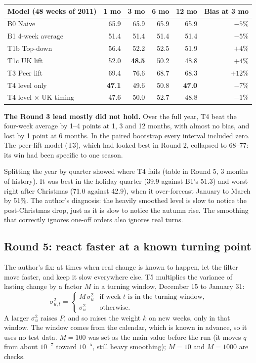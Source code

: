 \documentclass[11pt]{article}
\newcommand{\best}[1]{\textbf{#1}}
\begin{document}
\begin{center}
\begin{tabular}{l r r r r r}
\toprule
Model (48 weeks of 2011) & 1 mo & 3 mo & 6 mo & 12 mo & Bias at 3 mo \\
\midrule
B0 Naive & 65.9 & 65.9 & 65.9 & 65.9 & $-5\%$ \\
B1 4-week average & 51.4 & 51.4 & 51.4 & 51.4 & $-5\%$ \\
T1b Top-down & 56.4 & 52.2 & 52.5 & 51.9 & $+4\%$ \\
T1c UK lift & 52.0 & \best{48.5} & 50.2 & 48.8 & $+4\%$ \\
T3 Peer lift & 69.4 & 76.6 & 68.7 & 68.3 & $+12\%$ \\
T4 level only & \best{47.1} & 49.6 & 50.8 & \best{47.0} & $-7\%$ \\
T4 level $\times$ UK timing & 47.6 & 50.0 & 52.7 & 48.8 & $-1\%$ \\
\bottomrule
\end{tabular}
\end{center}

\textbf{The Round 3 lead mostly did not hold.} Over the full year, T4 beat the four-week average by 1--4
points at 1, 3 and 12 months, with almost no bias, and lost by 1 point at 6 months. In the paired
bootstrap every interval included zero. The peer-lift model (T3), which had looked best in Round 2,
collapsed to 68--77: its win had been specific to one season.

Splitting the year by quarter showed where T4 fails (table in Round 5, 3 months of history). It was best
in the holiday quarter (39.9 against B1's 51.3) and worst right after Christmas (71.0 against 42.9), when it
over-forecast January to March by 51\%. The author's diagnosis: the heavily smoothed level is slow to
notice the post-Christmas drop, just as it is slow to notice the autumn rise. The smoothing that correctly
ignores one-off orders also ignores real turns.

\subsection*{Round 5: react faster at a known turning point}

The author's fix: at times when real change is known to happen, let the filter move faster, and keep it
slow everywhere else. T5 multiplies the variance of lasting change by a factor $M$ in a turning window,
December 15 to January 31:
\[
\sigma_{u,t}^2 = \begin{cases} M\,\sigma_u^2 & \text{if week } t \text{ is in the turning window,}\\
\sigma_u^2 & \text{otherwise.}\end{cases}
\]
A larger $\sigma_u^2$ raises $P$, and so raises the weight $k$ on new weeks, only in that window. The
window comes from the calendar, which is known in advance, so it uses no test data. $M = 100$ was set as
the main value before the run (it moves $q$ from about $10^{-7}$ toward $10^{-5}$, still heavy smoothing);
$M = 10$ and $M = 1000$ are checks.
\end{document}
